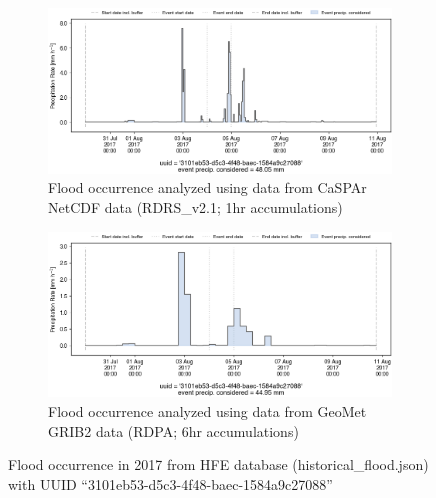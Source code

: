 \documentclass[10pt,a4paper,titlepage,parskip]{scrartcl}
\begin{document}
\begin{figure}[h]
	\begin{subfigure}[a]{1.0\textwidth}
		\centering
		\includegraphics[width=\linewidth]{figures/compare_Geomet_CaSPAr/interpolated_at_stations_occurrence_932_identified-timesteps_RDRS_v2.1.png}
		\caption{Flood occurrence analyzed using data from CaSPAr NetCDF data (RDRS\_v2.1; 1hr accumulations)}
	\end{subfigure}
	\par\bigskip\bigskip
	\begin{subfigure}[b]{1.0\textwidth}
		\centering
		\includegraphics[width=\linewidth]{figures/compare_Geomet_CaSPAr/interpolated_at_stations_occurrence_932_identified-timesteps_rdpa:10km:6f.png}
		\caption{Flood occurrence analyzed using data from GeoMet GRIB2 data (RDPA; 6hr accumulations)}
	\end{subfigure}
	\par\bigskip\bigskip
	\caption{Flood occurrence in 2017 from HFE database (historical\_flood.json) with UUID ``3101eb53-d5c3-4f48-baec-1584a9c27088''}
\end{figure}
\pagebreak
\end{document}
